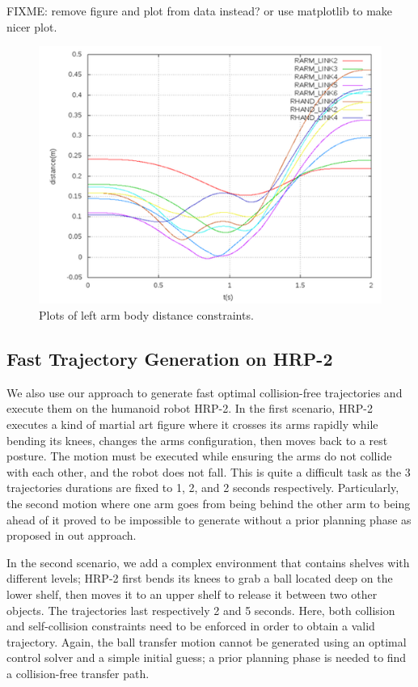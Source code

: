 FIXME: remove figure and plot from data instead? or use matplotlib to
make nicer plot.

\begin{figure}
  \centering
  \includegraphics[width=0.8\linewidth]
                  {src/chap3-optimal-motion-planning/figure/distance-constraints.png}
  \caption{Plots of left arm body distance constraints.}
  \label{simple-distance-constraints}
\end{figure}

\subsection{Fast Trajectory Generation on HRP-2}

We also use our approach to generate fast optimal collision-free
trajectories and execute them on the humanoid robot HRP-2. In the
first scenario, HRP-2 executes a kind of martial art figure where it
crosses its arms rapidly while bending its knees, changes the arms
configuration, then moves back to a rest posture. The motion must be
executed while ensuring the arms do not collide with each other, and
the robot does not fall. This is quite a difficult task as the 3
trajectories durations are fixed to 1, 2, and 2 seconds
respectively. Particularly, the second motion where one arm goes from
being behind the other arm to being ahead of it proved to be
impossible to generate without a prior planning phase as proposed in
out approach.

In the second scenario, we add a complex environment that contains
shelves with different levels; HRP-2 first bends its knees to grab a
ball located deep on the lower shelf, then moves it to an upper shelf
to release it between two other objects. The trajectories last
respectively 2 and 5 seconds. Here, both collision and self-collision
constraints need to be enforced in order to obtain a valid
trajectory. Again, the ball transfer motion cannot be generated using
an optimal control solver and a simple initial guess; a prior planning
phase is needed to find a collision-free transfer path.

